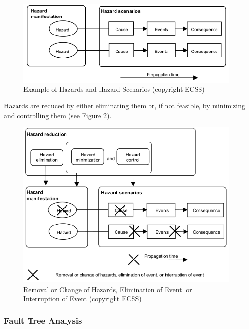 \begin{figure}[h]
\centering\includegraphics[scale=0.6]{fig/example_of_hazards_and_hazard_scenarios}
\caption{Example of Hazards and Hazard Scenarios (copyright ECSS)}
\label{fig:Example of Hazards and Hazard Scenarios}
\end{figure}

Hazards are reduced by either eliminating them or, if not feasible, by minimizing and controlling them (see Figure \ref{fig:Removal or Change of Hazards, Elimination of Event, or Interruption of Event}). 

\begin{figure}[h]
\centering\includegraphics[scale=0.6]{fig/removal_or_change_of_hazards}
\caption{Removal or Change of Hazards, Elimination of Event, or Interruption of Event (copyright ECSS)}
\label{fig:Removal or Change of Hazards, Elimination of Event, or Interruption of Event}
\end{figure}

\subsubsection{Fault Tree Analysis}

